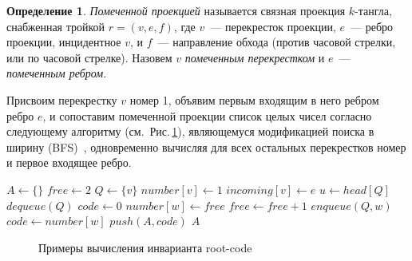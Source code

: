 \documentclass[12pt]{article}
\theoremstyle{plain}
\theoremstyle{definition}
\newtheorem{definition}{Определение}
\def\figureref#1{Рис.\,\protect\ref{#1}}
\def\RC{\hbox{root-code}}
\begin{document}
		\begin{definition}
			\textit{Помеченной проекцией} называется связная проекция $k$-тангла, снабженная тройкой
			$r=(v,e,f)$, где $v$~--- перекресток проекции, $e$~--- ребро проекции, инцидентное $v$, и $f$~---
			направление обхода (против часовой стрелки, или по часовой стрелке).
			Назовем $v$ \textit{помеченным перекрестком} и $e$~--- \textit{помеченным ребром}.
		\end{definition}

		Присвоим перекрестку $v$ номер 1, объявим первым входящим в него ребром ребро $e$, и сопоставим помеченной проекции список
		целых чисел согласно следующему алгоритму (см.~\figureref{figure:rcode-example}), являющемуся модификацией поиска
		в ширину (BFS)~\cite{CormenLeisersonRivestStein2009, Sedgewick1983}, одновременно вычисляя для всех остальных перекрестков
		номер и первое входящее ребро.

		\begin{algorithm}[ht]
			\footnotesize
			\caption{\small $\RC(P,(v,e,f)) $\label{algorithm:root-code}}
\begin{algorithmic}[1]
    \STATE $A \leftarrow \{\}$
    \STATE $free \leftarrow 2$
    \STATE $Q \leftarrow \{v\}$
    \STATE $number[v] \leftarrow 1$
    \STATE $incoming[v] \leftarrow e$
        \STATE $u \leftarrow head[Q]$
        \STATE $dequeue(Q)$
                \STATE $code \leftarrow 0$
            \ELSE
                    \STATE $number[w] \leftarrow free$
                    \STATE $free \leftarrow free + 1$
                    \STATE $enqueue(Q, w)$
                \ENDIF
                \STATE $code \leftarrow number[w]$
            \ENDIF
            \STATE $push(A, code)$
        \ENDFOR
    \ENDWHILE
    \RETURN $A$
\end{algorithmic}
		\end{algorithm}

		\begin{figure}[ht]
			\centering
			\qquad
			\caption{\footnotesize Примеры вычисления инварианта \RC\label{figure:rcode-example}}
		\end{figure}
\end{document}
